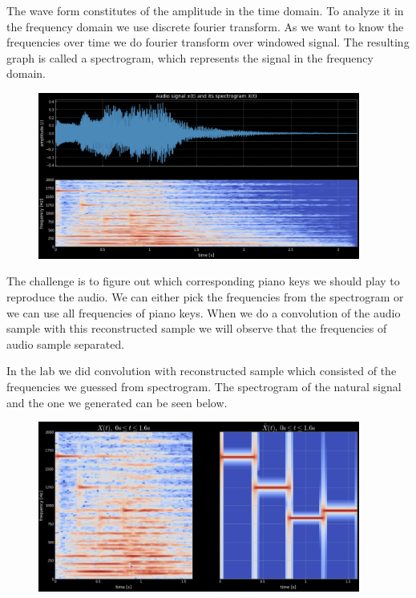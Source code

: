 The wave form constitutes of the amplitude  in the time domain. To analyze it in the frequency domain we use discrete fourier transform. As we want to know the frequencies over time we do fourier transform over windowed signal. The resulting graph is called a spectrogram, which represents the signal in the frequency domain.

\begin{figure}[ht]
    \centering
    \includegraphics[width=300pt]{labs/04/images/2.png}
    \label{fig:spectrogram}
\end{figure}

The challenge is to figure out which corresponding piano keys we should play to reproduce the audio. We can either pick the frequencies from the spectrogram or we can use all frequencies of piano keys. When we do a convolution of the audio sample with this reconstructed sample we will observe that the frequencies of audio sample separated. 

In the lab we did convolution with reconstructed sample which consisted of the frequencies we guessed from spectrogram. The spectrogram of the natural signal and the one we generated can be seen below.
\begin{figure}[ht]
    \centering
    \includegraphics[width=300pt]{labs/04/images/3.png}
    \label{fig:spectrograms of original and reconstruction}
\end{figure}
